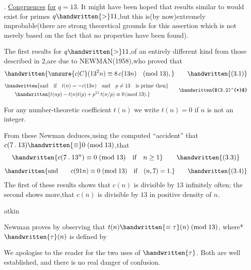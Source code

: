 . \uline{Congruences} \uline{for} $q=13$. It might have been hoped that results similar to  would exist for primes $q\handwritten{>}11$,but this is(by now)extremely improbable(there are strong theoretical grounds for this assertion which is not merely based on the fact that no properties have been found).

\noindent The first results for $q\handwritten{>}11$,of an entirely different kind from those described in \handwritten{\S}2,are due to NEWMAN(1958),who proved that
\[
\handwritten{\unsure{c|C}(13^{2}n)\equiv8\,c(13n)\quad(\mathrm{mod}\;13),}
\tag*{\handwritten{(3.1)}}
\]
\[
\begin{aligned}
&\handwritten{\text{and}\quad\text{if}\quad t(n)=-c(13n)\quad\text{and}\quad p\ne13\quad\text{is prime then}}\\
&\qquad\handwritten{t(np)-t(n)t(p)+p^{11}\,t(n/p)\equiv0\,(\mathrm{mod}\;13).}
\end{aligned}
\tag*{\handwritten{$(3.2)^{*}$}}
\]

\noindent\handwritten{\rule{\linewidth}{0.4pt}}

\noindent *For any number-theoretic coefficient \uline{$t(n)$} we write $t(n)=0$ if \uline{$n$} is not an integer.

\noindent\handwritten{\rule{\linewidth}{0.4pt}}

From these Newman deduces,using the computed ``accident'' that $c(7\mathbin{.}13)\handwritten{\equiv}0\;(\mathrm{mod}\;13)$,that
\[
\handwritten{c(7\mathbin{.}13^{n})\equiv0\;(\mathrm{mod}\;13)\quad \text{if}\quad n\geq1}
\tag*{\handwritten{(3.3)}}
\]
\[
\handwritten{\text{and}\qquad c(91n)\equiv0\;(\mathrm{mod}\;13)\quad \text{if}\quad(n,7)=1.}
\tag*{\handwritten{(3.4)}}
\]
The first of these results shows that \uline{$c(n)$} is divisible by $13$ infinitely often; the second shows more,that \uline{$c(n)$} is divisible by $13$ in positive density of \uline{$n$}.


\noindent\hfill atkin 

Newman proves  by observing that $t(n)\handwritten{\equiv\tau}(n)\;(\mathrm{mod}\;13)$, where* $\handwritten{\tau}(n)$ is defined by

\noindent\handwritten{\rule{\linewidth}{0.4pt}}

\noindent *We apologise to the reader for the two uses of $\handwritten{\tau}$. Both are well established, and there is no real danger of confusion.


